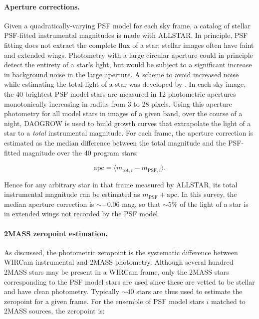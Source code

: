\documentclass[iop]{emulateapj}
\begin{document}
\paragraph{Aperture corrections.} Given a quadratically-varying PSF model for each sky frame, a catalog of stellar PSF-fitted instrumental magnitudes is made with ALLSTAR. In principle, PSF fitting does not extract the complete flux of a star; stellar images often have faint and extended wings. Photometry with a large circular aperture could in principle detect the entirety of a star's light, but would be subject to a significant increase in background noise in the large aperture. A scheme to avoid increased noise while estimating the total light of a star was developed by \cite{Stetson:1990}. In each sky image, the 40 brightest PSF model stars are measured in 12 photometric apertures monotonically increasing in radius from 3 to 28 pixels. Using this aperture photometry for all model stars in images of a given band, over the course of a night, DAOGROW is used to build growth curves that extrapolate the light of a star to a \emph{total} instrumental magnitude. For each frame, the aperture correction is estimated as the median difference between the total magnitude and the PSF-fitted magnitude over the 40 program stars:

\begin{equation}
    \text{apc} = \langle m_{\text{tot},i} - m_{\text{PSF},i}\rangle .
\end{equation}

\noindent Hence for any arbitrary star in that frame measured by ALLSTAR, its total instrumental magnitude can be estimated as $m_\text{PSF} + \text{apc}$. In this survey, the median aperture correction is $\sim-0.06$ mag, so that $\sim5\%$ of the light of a star is in extended wings not recorded by the PSF model.

\paragraph{2MASS zeropoint estimation.} As discussed, the photometric zeropoint is the systematic difference between WIRCam instrumental and 2MASS photometry. Although several hundred 2MASS stars may be present in a WIRCam frame, only the 2MASS stars corresponding to the PSF model stars are used since these are vetted to be stellar and have clean photometry. Typically $\sim 40$ stars are thus used to estimate the zeropoint for a given frame. For the ensemble of PSF model stars $i$ matched to 2MASS sources, the zeropoint is:
\end{document}
